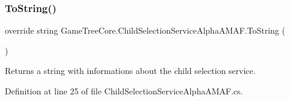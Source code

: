 \subsubsection{\texorpdfstring{To\+String()}{ToString()}}
{\footnotesize\ttfamily override string Game\+Tree\+Core.\+Child\+Selection\+Service\+Alpha\+A\+M\+A\+F.\+To\+String (\begin{DoxyParamCaption}{ }\end{DoxyParamCaption})}



Returns a string with informations about the child selection service. 



Definition at line 25 of file Child\+Selection\+Service\+Alpha\+A\+M\+A\+F.\+cs.

